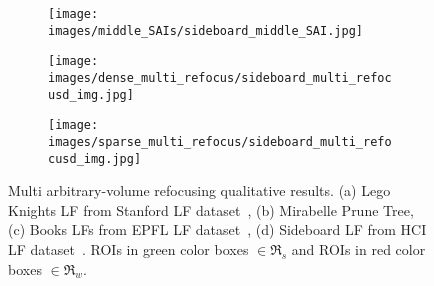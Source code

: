 \begin{figure*}[]
    \begin{subfigure}[t]{0.29\textwidth}
         \centering
         \texttt{[image: images/middle\_SAIs/sideboard\_middle\_SAI.jpg]}
     \end{subfigure}
     \hspace{0.1cm}
    \begin{subfigure}[t]{0.29\textwidth}
         \centering
         \texttt{[image: images/dense\_multi\_refocus/sideboard\_multi\_refocusd\_img.jpg]}
         \caption{}
     \end{subfigure}
     \hspace{0.1cm}
     \begin{subfigure}[t]{0.29\textwidth}
         \centering
         \texttt{[image: images/sparse\_multi\_refocus/sideboard\_multi\_refocusd\_img.jpg]}
     \end{subfigure}
     
     
    \caption{Multi arbitrary-volume refocusing qualitative results. (a) Lego Knights LF from Stanford LF dataset~\cite{stanfordnewdataset}, (b) Mirabelle Prune Tree, (c) Books LFs from EPFL LF dataset~\cite{epfldataset}, (d) Sideboard LF from HCI LF dataset~\cite{hcidataset}. ROIs in green color boxes $\in \mathfrak{R}_{s}$ and ROIs in red color boxes $\in \mathfrak{R}_{w}$.}
    \label{fig:qualitative}
\end{figure*}
